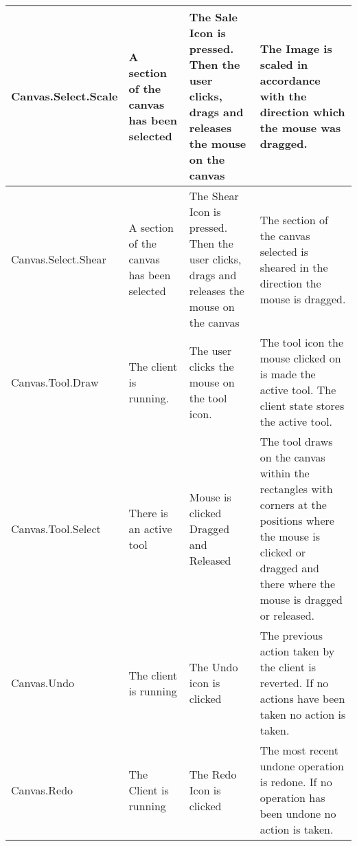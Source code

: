 \documentclass[11pt,oneside,a4paper]{article}
\begin{document}
\begin{tabular}{ | p{3cm} | p{3cm} | p{3cm} | p{3cm} | }
\hline
\tiny{Canvas.Select.Scale} & \tiny{A section of the canvas has been selected}
 & \tiny{The Sale Icon is pressed. Then the user clicks, drags and releases the mouse on the canvas} 
& \tiny{The Image is scaled in accordance with the direction which the mouse was dragged.  }
\\

\hline
\tiny{Canvas.Select.Shear} & \tiny{A section of the canvas has been selected} 
& \tiny{The Shear Icon is pressed. Then the user clicks, drags and releases the mouse on the canvas} 
& \tiny{The section of the canvas selected is sheared in the direction the mouse is dragged.}
\\

\hline
\tiny{Canvas.Tool.Draw} & \tiny{The client is running.} & \tiny{The user clicks the mouse on the tool icon.} 
& \tiny{The tool icon the mouse clicked on is made the active tool.  The client state stores the active tool.}
\\

\hline
\tiny{Canvas.Tool.Select} & \tiny{There is an active tool} & \tiny{Mouse is clicked Dragged and Released} & \tiny{The tool draws on the canvas within the rectangles with corners at the positions where the mouse is clicked or dragged and there where the mouse is dragged or released.  }
\\

\hline
\tiny{Canvas.Undo} & \tiny{The client is running} & \tiny{The Undo icon is clicked } & \tiny{The previous action taken by the client is reverted. If no actions have been taken no action is taken. }
\\

\hline
\tiny{Canvas.Redo} & \tiny{The Client is running} & \tiny{The Redo Icon is clicked} & \tiny{The most recent undone operation is redone.  If no operation has been undone no action is taken.}
\\


\end{tabular}
\end{document}

